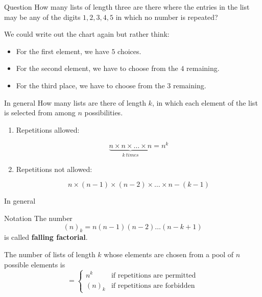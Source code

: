 \documentclass{beamer}
\begin{document}
\begin{frame}

\begin{block}{Question}
How many lists of length three are there where the entries in the list may be any of the digits $1,2,3,4,5$ in which no number is repeated?
\end{block}\pause

We could write out the chart again but rather think:
\begin{itemize}
\item For the first element, we have $5$ choices.\pause
\item For the second element, we have to choose from the $4$ remaining.\pause
\item For the third place, we have to choose from the $3$ remaining.
\end{itemize}\pause


\end{frame}

\begin{frame}{In general}
How many lists are there of length $k$, in which each element of the list is selected from among $n$ possibilities.
\begin{enumerate}
\item Repetitions allowed:
\begin{block}{}
\[
\underbrace{n\times n\times\dots\times n}_{k~times}=n^k
\]
\end{block}
\item Repetitions not allowed: 
\begin{block}{}
\[
n\times(n-1)\times(n-2)\times\dots\times n-(k-1)
\]
\end{block}

\end{enumerate}

\end{frame}

\begin{frame}{In general}
\begin{block}{Notation}
The number
\[
(n)_k=n(n-1)(n-2)\dots (n-k+1)
\]
is called \textbf{falling factorial}.
\end{block}\pause

\begin{theorem}
The number of lists of length $k$ whose elements are chosen from a pool of $n$ possible elements is
\[
=\left\{\begin{array}{cc}
n^k&\textrm{if repetitions are permitted}\\
(n)_k&\textrm{if repetitions are forbidden}
\end{array}\right.
\]
\end{theorem}
\end{frame}
\end{document}
